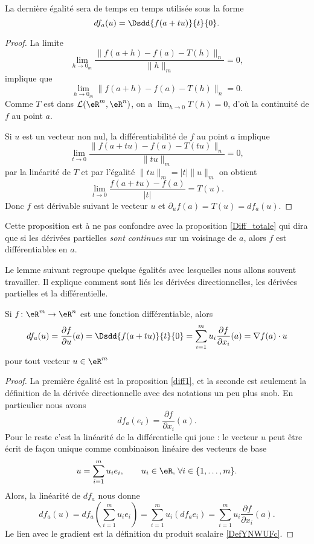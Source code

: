 La dernière égalité sera de temps en temps utilisée sous la forme
\begin{equation}    \label{EqOWQSoMA}
    df_a(u)=\Dsdd{ f(a+tu) }{t}{0}.
\end{equation}

\begin{proof}
  La limite
\[
\lim_{h\to 0_m}\frac{\|f(a+h)-f(a)-T(h)\|_n}{\|h\|_m}=0,
\]
implique que
 \[
\lim_{h\to 0_m}\|f(a+h)-f(a)-T(h)\|_n=0.
\]
Comme $T$ est dans $\mathcal{L}(\eR^m,\eR^n)$, on a $\lim_{h\to 0}T(h)=0$, d'où la continuité de $f$ au point $a$.

Si $u$ est un vecteur non nul, la différentiabilité de $f$ au point $a$ implique
\[
\lim_{t\to 0}\frac{\|f(a+tu)-f(a)-T(tu)\|_n}{\|tu\|_m}=0,
\]
par la linéarité de $T$ et par l'égalité $\|tu\|_m=|t|\|u\|_m$ on obtient
\[
\lim_{t\to 0}\frac{f(a+tu)-f(a)}{|t|}= T(u).
\]
Donc $f$ est dérivable suivant le vecteur $u$ et $\partial_uf(a)=T(u)=df_a(u)$.
\end{proof}

Cette proposition est à ne pas confondre avec la proposition \ref{Diff_totale} qui dira que si les dérivées partielles \emph{sont continues} sur un voisinage de $a$, alors $f$ est différentiables en $a$.

Le lemme suivant regroupe quelque égalités avec lesquelles nous allons souvent travailler. Il explique comment sont liés les dérivées directionnelles, les dérivées partielles et la différentielle.
\begin{lemma}		\label{LemdfaSurLesPartielles}
	Si $f\colon \eR^m\to \eR^n$ est une fonction différentiable, alors
	\begin{equation}
        df_a(u)=\frac{ \partial f }{ \partial u }(a)=\Dsdd{ f(a+tu) }{t}{0}=\sum_{i=1}^mu_i\frac{ \partial f }{ \partial x_i }(a)=\nabla f(a)\cdot u
	\end{equation}
	pour tout vecteur $u\in\eR^m$
\end{lemma}

\begin{proof}
La première égalité est la proposition \ref{diff1}, et la seconde est seulement la définition de la dérivée directionnelle avec des notations un peu plus snob. En particulier nous avons
\begin{equation}
    df_a(e_i)=\frac{ \partial f }{ \partial x_i }(a).
\end{equation}
Pour le reste c'est la linéarité de la différentielle qui joue : le vecteur $u$ peut être écrit de façon unique comme combinaison linéaire des vecteurs de base 
\[
u=\sum_{i=1}^{m}u_i e_i, \qquad  u_i\in\eR,\, \forall i\in\{1,\ldots, m\}.
\]
Alors, la linéarité de $df_a$ nous donne
\begin{equation}
     df_a(u)= df_a\left(\sum_{i=1}^{m}u_i e_i\right)
=\sum_{i=1}^{m}u_i \left(df_ae_i\right)
=\sum_{i=1}^{m}u_i \frac{ \partial f }{ \partial x_i }(a).
 \end{equation}
Le lien avec le gradient est la définition du produit scalaire \eqref{DefYNWUFc}.
\end{proof}

